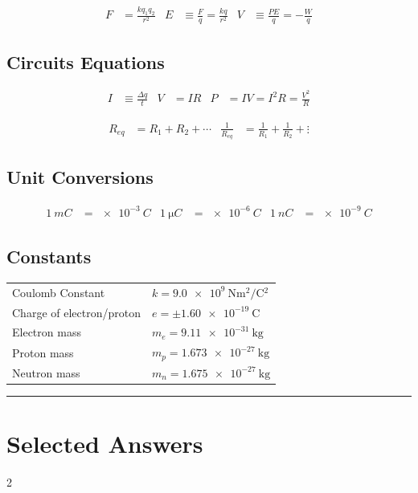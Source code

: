 \documentclass[10pt]{exam}
\def\theanswers{\theendnotes}
\begin{document}
\begin{align*}
  F &= \frac{kq_1 q_2} {r^2} &
  E &\equiv \frac{F}{q} = \frac{kq}{r^2} &
  V &\equiv \frac{PE}{q} = -\frac{W}{q}
\end{align*}

\subsection*{Circuits Equations}

\begin{align*}
  I &\equiv \frac{\Delta q}{t} &
  V &= IR &
  P &= IV = I^2 R = \frac{V^2}{R}
\end{align*}


\begin{align*}
  R_{eq} &= R_1 + R_2 + \cdots &
  \frac{1}{R_{eq}} &= \frac{1}{R_1} + \frac{1}{R_2} + \vdots
\end{align*}

\subsection*{Unit Conversions}

\begin{align*}
  \SI{1}{mC}       &= \SI{e-3}{C} &
  \SI{1}{\micro C} &= \SI{e-6}{C} &
  \SI{1}{n C}      &= \SI{e-9}{C}
\end{align*}


\subsection*{Constants}

\vspace{2em}

\begin{tabular}{ll}
Coulomb Constant          &   $k = \SI{9.0e9}{\newton\meter^2\per\coulomb^2}$\\
Charge of electron/proton &   $e=\pm\SI{1.60e-19}{\coulomb}$\\
Electron mass             &   $m_e=\SI{9.11e-31}{\kilo\gram}$\\
Proton mass	              &   $m_p=\SI{1.673e-27}{\kilo\gram}$\\
Neutron mass	            &   $m_n=\SI{1.675e-27}{\kilo\gram}$
\end{tabular}

\vs
\hrule

\section*{Selected Answers}

  \renewcommand{\enotesize}{\normalsize}
  \renewcommand{\enoteformat}{%
    \leftskip=1.8em
    \makebox[0pt][r]{\theenmark. }%
  }

  \hfill

  \begin{multicols}{2}
    \theanswers
  \end{multicols}
\end{document}
